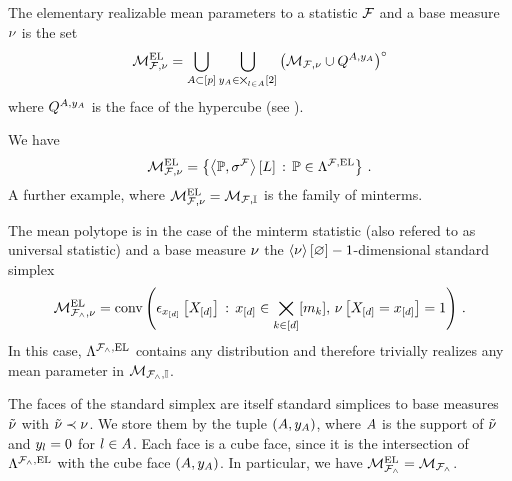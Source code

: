 \begin{definition}
    \label{def:elementaryRealizableMeanParams}
    The elementary realizable mean parameters to a statistic $\mathcal{F}$ and a base measure $\nu$ is the set
    \begin{align*}
        \mathcal{M}^{\mathrm{EL}}_{\mathcal{F},\nu}
        = \bigcup_{A\subset[p]} \bigcup_{y_{A}\in\bigtimes_{l\in A}[2]}
        {\left(\mathcal{M}_{\mathcal{F},\nu}\cup Q^{A,y_{A}}\right)}^{\circ}
    \end{align*}
    where $Q^{A,y_{A}}$ is the face of the hypercube (see ).
\end{definition}

We have
\begin{align*}
    \mathcal{M}^{\mathrm{EL}}_{\mathcal{F},\nu}
    = \left\{ \left\langle \mathbb{P},\sigma^{\mathcal{F}}\right\rangle \left[ L \right] \,:\, \mathbb{P}\in\Lambda^{\mathcal{F},\mathrm{EL}} \right\} \, .
\end{align*}
A further example, where $\mathcal{M}^{\mathrm{EL}}_{\mathcal{F},\nu}=\mathcal{M}_{\mathcal{F},\mathbb{I}}$ is the family of minterms.

\begin{example}
    \label{exa:mintermHLNSet}
    The mean polytope is in the case of the minterm statistic (also refered to as universal statistic) and a base measure $\nu$ the $\left\langle \nu\right\rangle \left[ \varnothing \right]-1$-dimensional standard simplex
    \begin{align*}
        \mathcal{M}^{\mathrm{EL}}_{\mathcal{F}_{\land},\nu}
        = \mathrm{conv}\left(\epsilon_{x_{[d]}}\left[X_{[d]}\right]\,:\,x_{[d]}\in\bigtimes_{k\in[d]}[m_{k}],\,\nu\left[X_{[d]}=x_{[d]}\right]=1\right) \, .
    \end{align*}
    In this case, $\Lambda^{\mathcal{F}_{\land},\mathrm{EL}}$ contains any distribution and therefore trivially realizes any mean parameter in $\mathcal{M}_{\mathcal{F}_{\land},\mathbb{I}}$.

    The faces of the standard simplex are itself standard simplices to base measures $\tilde{\nu}$ with $\tilde{\nu}\prec\nu$.
    We store them by the tuple $(A,y_{A})$, where $A$ is the support of $\tilde{\nu}$ and $y_{l}=0$ for $l\in A$.
    Each face is a cube face, since it is the intersection of $\Lambda^{\mathcal{F}_{\land},\mathrm{EL}}$ with the cube face $(A,y_{A})$.
    In particular, we have $\mathcal{M}^{\mathrm{EL}}_{\mathcal{F}_{\land}}=\mathcal{M}_{\mathcal{F}_{\land}}$.
\end{example}


